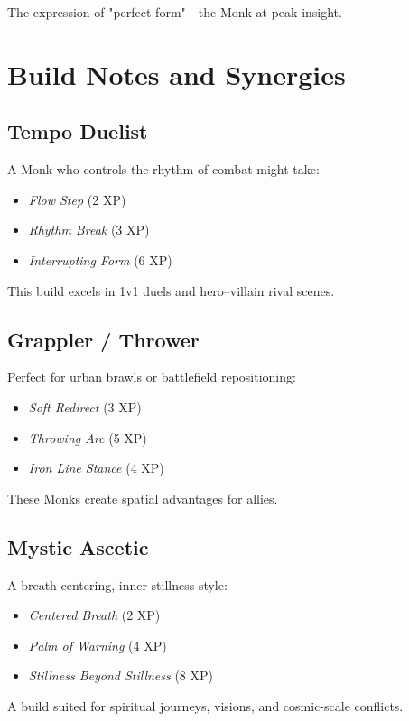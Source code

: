 \documentclass[11pt]{book}
\begin{document}
The expression of "perfect form"---the Monk at peak insight.

\section{Build Notes and Synergies}

\subsection{Tempo Duelist}

A Monk who controls the rhythm of combat might take:
\begin{itemize}
  \item \emph{Flow Step} (2 XP)
  \item \emph{Rhythm Break} (3 XP)
  \item \emph{Interrupting Form} (6 XP)
\end{itemize}

This build excels in 1v1 duels and hero--villain rival scenes.

\subsection{Grappler / Thrower}

Perfect for urban brawls or battlefield repositioning:
\begin{itemize}
  \item \emph{Soft Redirect} (3 XP)
  \item \emph{Throwing Arc} (5 XP)
  \item \emph{Iron Line Stance} (4 XP)
\end{itemize}

These Monks create spatial advantages for allies.

\subsection{Mystic Ascetic}

A breath-centering, inner-stillness style:
\begin{itemize}
  \item \emph{Centered Breath} (2 XP)
  \item \emph{Palm of Warning} (4 XP)
  \item \emph{Stillness Beyond Stillness} (8 XP)
\end{itemize}

A build suited for spiritual journeys, visions, and cosmic-scale conflicts.
\end{document}
